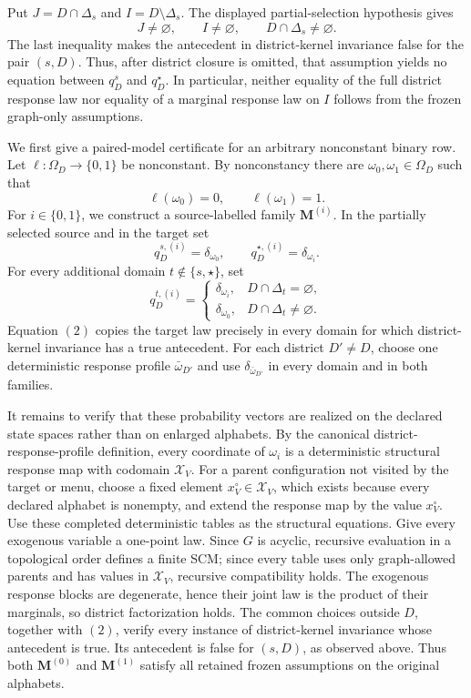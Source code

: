 Put \(J=D\cap\Delta_s\) and \(I=D\setminus\Delta_s\).  The displayed
partial-selection hypothesis gives
\[
J\ne\varnothing,
\qquad
I\ne\varnothing,
\qquad
D\cap\Delta_s\ne\varnothing.
\]
The last inequality makes the antecedent in district-kernel invariance false
for the pair \((s,D)\).  Thus, after district closure is omitted, that
assumption yields no equation between \(q_D^s\) and \(q_D^\star\).  In
particular, neither equality of the full district response law nor equality
of a marginal response law on \(I\) follows from the frozen graph-only
assumptions.

We first give a paired-model certificate for an arbitrary nonconstant binary
row.  Let \(\ell:\Omega_D\to\{0,1\}\) be nonconstant.  By nonconstancy there
are \(\omega_0,\omega_1\in\Omega_D\) such that
\[
\ell(\omega_0)=0,
\qquad
\ell(\omega_1)=1.
\]
For \(i\in\{0,1\}\), we construct a source-labelled family
\(\mathbf M^{(i)}\).  In the partially selected source and in the target set
\[
q_D^{s,(i)}=\delta_{\omega_0},
\qquad
q_D^{\star,(i)}=\delta_{\omega_i}.
\tag{1}
\]
For every additional domain \(t\notin\{s,\star\}\), set
\[
q_D^{t,(i)}=
\begin{cases}
\delta_{\omega_i},&D\cap\Delta_t=\varnothing,\\
\delta_{\omega_0},&D\cap\Delta_t\ne\varnothing.
\end{cases}
\tag{2}
\]
Equation \((2)\) copies the target law precisely in every domain for which
district-kernel invariance has a true antecedent.  For each district
\(D'\ne D\), choose one deterministic response profile
\(\bar\omega_{D'}\) and use \(\delta_{\bar\omega_{D'}}\) in every domain and
in both families.

It remains to verify that these probability vectors are realized on the
declared state spaces rather than on enlarged alphabets.  By the canonical
district-response-profile definition, every coordinate of
\(\omega_i\) is a deterministic structural response map with codomain
\(\mathcal X_V\).  For a parent configuration not visited by the target or
menu, choose a fixed element \(x_V^\circ\in\mathcal X_V\), which exists
because every declared alphabet is nonempty, and extend the response map by
the value \(x_V^\circ\).  Use these completed deterministic tables as the
structural equations.  Give every exogenous variable a one-point law.  Since
\(G\) is acyclic, recursive evaluation in a topological order defines a
finite SCM; since every table uses only graph-allowed parents and has values
in \(\mathcal X_V\), recursive compatibility holds.  The exogenous response
blocks are degenerate, hence their joint law is the product of their
marginals, so district factorization holds.  The common choices outside
\(D\), together with \((2)\), verify every instance of district-kernel
invariance whose antecedent is true.  Its antecedent is false for \((s,D)\),
as observed above.  Thus both \(\mathbf M^{(0)}\) and
\(\mathbf M^{(1)}\) satisfy all retained frozen assumptions on the original
alphabets.

